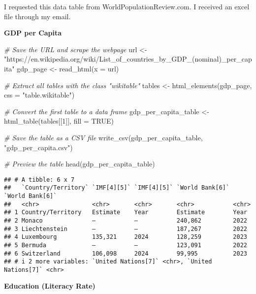 \documentclass[
]{article}
\newenvironment{Shaded}{\begin{snugshade}}{\end{snugshade}}
\newcommand{\AttributeTok}[1]{\textcolor[rgb]{0.77,0.63,0.00}{#1}}
\newcommand{\CommentTok}[1]{\textcolor[rgb]{0.56,0.35,0.01}{\textit{#1}}}
\newcommand{\ConstantTok}[1]{\textcolor[rgb]{0.00,0.00,0.00}{#1}}
\newcommand{\DecValTok}[1]{\textcolor[rgb]{0.00,0.00,0.81}{#1}}
\newcommand{\FunctionTok}[1]{\textcolor[rgb]{0.00,0.00,0.00}{#1}}
\newcommand{\NormalTok}[1]{#1}
\newcommand{\OtherTok}[1]{\textcolor[rgb]{0.56,0.35,0.01}{#1}}
\newcommand{\StringTok}[1]{\textcolor[rgb]{0.31,0.60,0.02}{#1}}
\begin{document}
I requested this data table from WorldPopulationReview.com. I received
an excel file through my email.

\textbf{GDP per Capita}

\begin{Shaded}
\begin{Highlighting}[]
\CommentTok{\# Save the URL and scrape the webpage}
\NormalTok{url }\OtherTok{\textless{}{-}} \StringTok{"https://en.wikipedia.org/wiki/List\_of\_countries\_by\_GDP\_(nominal)\_per\_capita"}
\NormalTok{gdp\_page }\OtherTok{\textless{}{-}} \FunctionTok{read\_html}\NormalTok{(}\AttributeTok{x =}\NormalTok{ url)}

\CommentTok{\# Extract all tables with the class "wikitable"}
\NormalTok{tables }\OtherTok{\textless{}{-}} \FunctionTok{html\_elements}\NormalTok{(gdp\_page, }\AttributeTok{css =} \StringTok{"table.wikitable"}\NormalTok{)}

\CommentTok{\# Convert the first table to a data frame}
\NormalTok{gdp\_per\_capita\_table }\OtherTok{\textless{}{-}} \FunctionTok{html\_table}\NormalTok{(tables[[}\DecValTok{1}\NormalTok{]], }\AttributeTok{fill =} \ConstantTok{TRUE}\NormalTok{)}

\CommentTok{\# Save the table as a CSV file}
\FunctionTok{write\_csv}\NormalTok{(gdp\_per\_capita\_table, }\StringTok{"gdp\_per\_capita.csv"}\NormalTok{)}

\CommentTok{\# Preview the table}
\FunctionTok{head}\NormalTok{(gdp\_per\_capita\_table)}
\end{Highlighting}
\end{Shaded}

\begin{verbatim}
## # A tibble: 6 x 7
##   `Country/Territory` `IMF[4][5]` `IMF[4][5]` `World Bank[6]` `World Bank[6]`
##   <chr>               <chr>       <chr>       <chr>           <chr>          
## 1 Country/Territory   Estimate    Year        Estimate        Year           
## 2 Monaco              —           —           240,862         2022           
## 3 Liechtenstein       —           —           187,267         2022           
## 4 Luxembourg          135,321     2024        128,259         2023           
## 5 Bermuda             —           —           123,091         2022           
## 6 Switzerland         106,098     2024        99,995          2023           
## # i 2 more variables: `United Nations[7]` <chr>, `United Nations[7]` <chr>
\end{verbatim}

\textbf{Education (Literacy Rate)}
\end{document}
